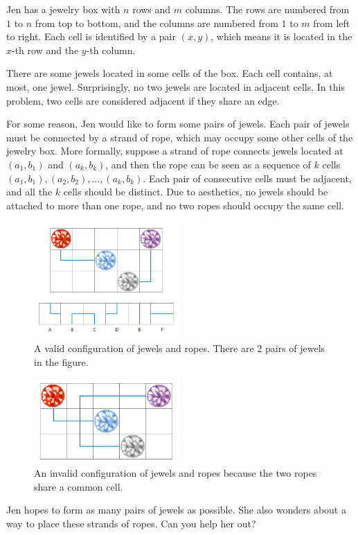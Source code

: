 Jen has a jewelry box with $n$ rows and $m$ columns.
The rows are numbered from $1$ to $n$ from top to bottom, and the columns are numbered from $1$ to $m$ from left to right.
Each cell is identified by a pair $(x, y)$, which means it is located in the $x$-th row and the $y$-th column.

There are some jewels located in some cells of the box.
Each cell contains, at most, one jewel.
Surprisingly, no two jewels are located in adjacent cells.
In this problem, two cells are considered adjacent if they share an edge.

For some reason, Jen would like to form some pairs of jewels.
Each pair of jewels must be connected by a strand of rope, which may occupy some other cells of the jewelry box.
More formally, suppose a strand of rope connects jewels located at $(a_1,b_1)$ and $(a_k,b_k)$, and then the rope can be seen as a sequence of $k$ cells $(a_1,b_1),(a_2,b_2),\ldots,(a_k,b_k)$.
Each pair of consecutive cells must be adjacent, and all the $k$ cells should be distinct.
Due to aesthetics, no jewels should be attached to more than one rope, and no two ropes should occupy the same cell.

\newpage

\begin{figure}[h]
    \center
    \includegraphics[width=0.5\textwidth]{image/jewel1.png}
    \caption{A valid configuration of jewels and ropes. There are $2$ pairs of jewels in the figure.}
    \end{figure}
    \begin{figure}[h]
    \center
    \includegraphics[width=0.5\textwidth]{image/jewel2.png}
    \caption{An invalid configuration of jewels and ropes because the two ropes share a common cell.}
    \end{figure}
Jen hopes to form as many pairs of jewels as possible. She also wonders about a way to place these strands of ropes. Can you help her out?